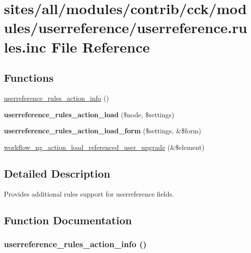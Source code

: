 \hypertarget{userreference_8rules_8inc}{
\section{sites/all/modules/contrib/cck/modules/userreference/userreference.rules.inc File Reference}
\label{userreference_8rules_8inc}
}
\subsection*{Functions}
\begin{CompactItemize}
\item 
\hyperlink{userreference_8rules_8inc_1a600050975d091c48ca248fce9be75b}{userreference\_\-rules\_\-action\_\-info} ()
\item 
\hypertarget{userreference_8rules_8inc_6d090f0b42e45ecb87ae8055d713e183}{
\textbf{userreference\_\-rules\_\-action\_\-load} (\$node, \$settings)}
\label{userreference_8rules_8inc_6d090f0b42e45ecb87ae8055d713e183}

\item 
\hypertarget{userreference_8rules_8inc_3b4ff28271316245c4ac1ae2ba8fc693}{
\textbf{userreference\_\-rules\_\-action\_\-load\_\-form} (\$settings, \&\$form)}
\label{userreference_8rules_8inc_3b4ff28271316245c4ac1ae2ba8fc693}

\item 
\hyperlink{userreference_8rules_8inc_83d45657e432a674912574d8efc65684}{workflow\_\-ng\_\-action\_\-load\_\-referenced\_\-user\_\-upgrade} (\&\$element)
\end{CompactItemize}


\subsection{Detailed Description}
Provides additional rules support for userreference fields. 

\subsection{Function Documentation}
\hypertarget{userreference_8rules_8inc_1a600050975d091c48ca248fce9be75b}{
\subsubsection[{userreference\_\-rules\_\-action\_\-info}]{\setlength{\rightskip}{0pt plus 5cm}userreference\_\-rules\_\-action\_\-info ()}}
\label{userreference_8rules_8inc_1a600050975d091c48ca248fce9be75b}


